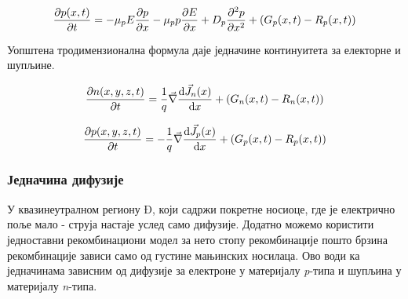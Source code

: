 \documentclass{article}
\begin{document}
\begin{equation*}
	\pdv{p(x,t)}{t}   = - \mu_p E \pdv{p}{x} - \mu_p p \pdv{E}{x} + D_p \frac{\partial^2 p}{\partial x^2}  + (G_p(x,t) - R_p(x,t))
\end{equation*}

Уопштена тродимензионална формула даје једначине континуитета за електорне и шупљине.

\begin{equation*}
	\pdv{n(x,y,z,t)}{t}   = \dfrac{1}{q} \vec{\nabla} \dv{\vec{J}_n(x)}{x}  + (G_n(x,t) - R_n(x,t)) 
\end{equation*}

\begin{equation*}
	\pdv{p(x,y,z,t)}{t}   = -\dfrac{1}{q} \vec{\nabla} \dv{\vec{J}_p(x)}{x}   + (G_p(x,t) - R_p(x,t)) 
\end{equation*}








\subsubsection{Једначина дифузије}

У квазинеутралном региону Đ, који садржи покретне носиоце, где је електрично поље мало - струја настаје услед само дифузије. Додатно можемо користити једноставни рекомбинациони модел за нето стопу рекомбинације пошто брзина рекомбинације зависи само од густине мањинских носилаца. Ово води ка једначинама зависним од дифузије за електроне у материјалу \textit{p}-типа и шупљина у материјалу \textit{n}-типа.
\end{document}
